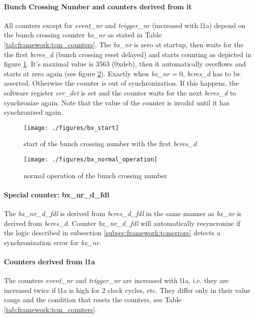 \paragraph{Bunch Crossing Number and counters derived from it}
All counters except for \textit{event\_nr} and \textit{trigger\_nr} (increased with l1a) depend on the bunch crossing counter \textit{bx\_nr} as stated in Table \ref{tab:framework:tcm_counters}. The \textit{bx\_nr} is zero at startup, then waits for the the first \textit{bcres\_d} (bunch crossing reset delayed) and starts counting as depicted in figure \ref{fig:bx_start}. It's maximal value is 3563 (0xdeb), then it automatically overflows and starts at zero again (see figure \ref{fig:bx_normal_operation}). Exactly when \textit{bx\_nr} = 0, \textit{bcres\_d} has to be asserted. Otherwise the counter is out of synchronization. If this happens, the software register \textit{err\_det} is set and the counter waits for the next \textit{bcres\_d} to synchronize again. Note that the value of the counter is invalid until it has synchronized again.

\begin{figure}[ht]
  \texttt{[image: ./figures/bx\_start]}
  \caption{start of the bunch crossing number with the first \textit{bcres\_d}}
  \label{fig:bx_start}
\end{figure}

\begin{figure}[ht]
  \texttt{[image: ./figures/bx\_normal\_operation]}
  \caption{normal operation of the bunch crossing number}
  \label{fig:bx_normal_operation}
\end{figure}

\paragraph{Special counter: bx\_nr\_d\_fdl}
The \textit{bx\_nr\_d\_fdl} is derived from \textit{bcres\_d\_fdl} in the same manner as \textit{bx\_nr} is derived from \textit{bcres\_d}. Counter \textit{bx\_nr\_d\_fdl} will automatically resyncronize if the logic described in subsection \ref{subsec:framework:tcmerrors} detects a synchronization error for \textit{bx\_nr}.

\paragraph{Counters derived from l1a}
The counters \textit{event\_nr} and \textit{trigger\_nr} are increased with l1a, i.e. they are increased twice if l1a is high for 2 clock cycles, etc. They differ only in their value range and the condition that resets the counters, see Table \ref{tab:framework:tcm_counters}.

